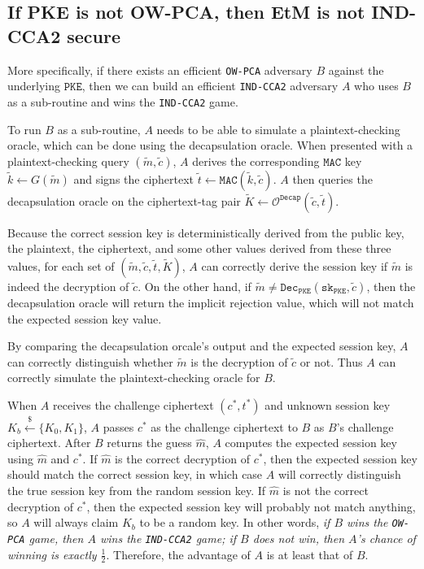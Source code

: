 \documentclass[floatrow,journal=tches,submission]{iacrtrans}
\newcommand{\pke}{\texttt{PKE}}
\newcommand{\decrypt}{\texttt{Dec}}
\newcommand{\decap}{\texttt{Decap}}
\newcommand{\mac}{\texttt{MAC}}
\newcommand{\sk}{\texttt{sk}}
\newcommand{\leftsample}{\stackrel{\$}{\leftarrow}}
\begin{document}
\subsection{If PKE is not OW-PCA, then EtM is not IND-CCA2 secure}\label{sec:not-owpca-implies-not-indcca2}
More specifically, if there exists an efficient \texttt{OW-PCA} adversary $B$ against the underlying $\pke$, then we can build an efficient \texttt{IND-CCA2} adversary $A$ who uses $B$ as a sub-routine and wins the \texttt{IND-CCA2} game.

To run $B$ as a sub-routine, $A$ needs to be able to simulate a plaintext-checking oracle, which can be done using the decapsulation oracle. When presented with a plaintext-checking query $(\tilde{m}, \tilde{c})$, $A$ derives the corresponding $\mac$ key $\tilde{k} \leftarrow G(\tilde{m})$ and signs the ciphertext $\tilde{t} \leftarrow \mac(\tilde{k}, \tilde{c})$. $A$ then queries the decapsulation oracle on the ciphertext-tag pair $\tilde{K} \leftarrow \mathcal{O}^\decap(\tilde{c}, \tilde{t})$.

Because the correct session key is deterministically derived from the public key, the plaintext, the ciphertext, and some other values derived from these three values, for each set of $(\tilde{m}, \tilde{c}, \tilde{t}, \tilde{K})$, $A$ can correctly derive the session key if $\tilde{m}$ is indeed the decryption of $\tilde{c}$. On the other hand, if $\tilde{m} \neq \decrypt_\pke(\sk_\pke, \tilde{c})$, then the decapsulation oracle will return the implicit rejection value, which will not match the expected session key value.

By comparing the decapsulation orcale's output and the expected session key, $A$ can correctly distinguish whether $\tilde{m}$ is the decryption of $\tilde{c}$ or not. Thus $A$ can correctly simulate the plaintext-checking oracle for $B$.

When $A$ receives the challenge ciphertext $(c^\ast, t^\ast)$ and unknown session key $K_b \leftsample \{K_0, K_1\}$, $A$ passes $c^\ast$ as the challenge ciphertext to $B$ as $B$'s challenge ciphertext. After $B$ returns the guess $\hat{m}$, $A$ computes the expected session key using $\hat{m}$ and $c^\ast$. If $\hat{m}$ is the correct decryption of $c^\ast$, then the expected session key should match the correct session key, in which case $A$ will correctly distinguish the true session key from the random session key. If $\hat{m}$ is not the correct decryption of $c^\ast$, then the expected session key will probably not match anything, so $A$ will always claim $K_b$ to be a random key. In other words, \emph{if $B$ wins the \texttt{OW-PCA} game, then $A$ wins the \texttt{IND-CCA2} game; if $B$ does not win, then $A$'s chance of winning is exactly $\frac{1}{2}$}. Therefore, the advantage of $A$ is at least that of $B$.
\end{document}
